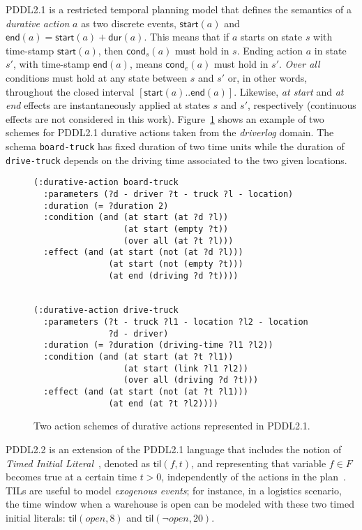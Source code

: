 \documentclass{ecai}
\newcommand{\cond}{\mathsf{cond}}  %
\newcommand{\dur}{\mathsf{dur}}    %
\newcommand{\start}{\mathsf{start}}%
\newcommand{\en}{\mathsf{end}}     %
\newcommand{\til}{\mathsf{til}}    %
\begin{document}
PDDL2.1 is a restricted temporal planning model that defines the semantics of a {\em durative action} $a$ as two discrete events, $\start(a)$ and $\en(a)=\start(a)+\dur(a)$. This means that if $a$ starts on state $s$ with time-stamp $\start(a)$, then $\cond_s(a)$ must hold in $s$. Ending action $a$ in state $s'$, with time-stamp $\en(a)$, means $\cond_e(a)$ must hold in $s'$. {\em Over all} conditions must hold at any state between $s$ and $s'$ or, in other words, throughout the closed interval $[\start(a)..\en(a)]$. Likewise, {\em at start} and {\em at end} effects are instantaneously applied at states $s$ and $s'$, respectively (continuous effects are not considered in this work). Figure~\ref{fig:exampleactions2} shows an example of two schemes for PDDL2.1 durative actions taken from the {\em driverlog} domain. The schema \texttt{board-truck} has fixed duration of two time units while the duration of \texttt{drive-truck} depends on the driving time associated to the two given locations.

\begin{figure}
\begin{footnotesize}    
\begin{verbatim}
(:durative-action board-truck
  :parameters (?d - driver ?t - truck ?l - location)
  :duration (= ?duration 2)
  :condition (and (at start (at ?d ?l)) 
                  (at start (empty ?t))
                  (over all (at ?t ?l)))
  :effect (and (at start (not (at ?d ?l))) 
               (at start (not (empty ?t)))
               (at end (driving ?d ?t))))


(:durative-action drive-truck
  :parameters (?t - truck ?l1 - location ?l2 - location 
               ?d - driver)
  :duration (= ?duration (driving-time ?l1 ?l2))
  :condition (and (at start (at ?t ?l1)) 
                  (at start (link ?l1 ?l2))
                  (over all (driving ?d ?t)))
  :effect (and (at start (not (at ?t ?l1))) 
               (at end (at ?t ?l2))))
\end{verbatim}
\end{footnotesize}    
\caption{Two action schemes of durative actions represented in PDDL2.1.}
\label{fig:exampleactions2}
\end{figure}

PDDL2.2 is an extension of the PDDL2.1 language that includes the notion of {\em Timed Initial Literal}~\cite{hoffmann2005}, denoted as $\til(f,t)$, and representing that variable $f\in F$ becomes true at a certain time $t>0$, independently of the actions in the plan~\cite{Edelkamp04}. TILs are useful to model {\em exogenous events}; for instance, in a logistics scenario, the time window when a warehouse is open can be modeled with these two timed initial literals: $\til(open,8)$ and $\til(\neg open,20)$.
\end{document}
